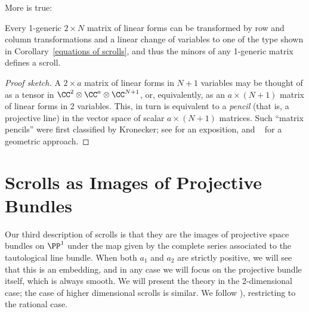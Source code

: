 More is true: 
\begin{theorem}\label{matrix pencils}
 Every
 1-generic $2 \times N$ matrix of linear forms can be transformed by row and column transformations and a linear change
 of variables to one of the type shown in
Corollary~\ref{equations of scrolls}, and thus the minors of any 1-generic matrix defines a scroll. 
\end{theorem}

\begin{proof}[Proof sketch]
A $2\times a$ matrix of linear forms in $N+1$ variables may be thought of as a tensor
in $\CC^{2}\otimes \CC^{a}\otimes \CC^{N+1}$, or, equivalently, as an $a\times (N+1)$ matrix of linear forms in 2 variables. This, in turn is equivalent to a \emph{pencil} (that is, a projective line) in the vector space of scalar $a\times (N+1)$ matrices. Such ``matrix pencils'' were first classified by Kronecker; see 
\cite[Theorems *** and ***]{Gantmacher} for an exposition, and ~\cite{Eisenbud-Harris-Centennial} for a geometric approach.
\end{proof}




\section{Scrolls as Images of Projective Bundles}\label{inscrutable name}

Our third description of scrolls is that they are the images of projective space bundles on $\PP^{1}$ under the map given by the complete series associated to the tautological line bundle. When both $a_{1}$ and $a_{2}$ are strictly positive, we will see that this is an embedding, and in any case we will focus on the projective bundle itself, which is always smooth. We will present the theory in the 2-dimensional case; the case of higher dimensional scrolls is similar. We follow  \cite[Chapter V]{Hartshorne1977}), restricting
to the rational case. 

